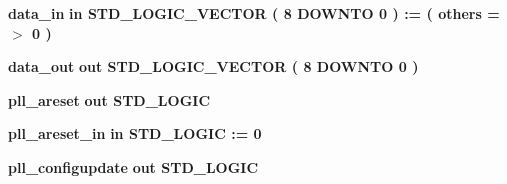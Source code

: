 \begin{DoxyCompactItemize}
\item 
{\bf data\+\_\+in}  {\bfseries {\bfseries \textcolor{keywordflow}{in}\textcolor{vhdlchar}{ }}} {\bfseries \textcolor{comment}{S\+T\+D\+\_\+\+L\+O\+G\+I\+C\+\_\+\+V\+E\+C\+T\+OR}\textcolor{vhdlchar}{ }\textcolor{vhdlchar}{(}\textcolor{vhdlchar}{ }\textcolor{vhdlchar}{ } \textcolor{vhdldigit}{8} \textcolor{vhdlchar}{ }\textcolor{keywordflow}{D\+O\+W\+N\+TO}\textcolor{vhdlchar}{ }\textcolor{vhdlchar}{ } \textcolor{vhdldigit}{0} \textcolor{vhdlchar}{ }\textcolor{vhdlchar}{)}\textcolor{vhdlchar}{ }\textcolor{vhdlchar}{ }\textcolor{vhdlchar}{ }\textcolor{vhdlchar}{\+:}\textcolor{vhdlchar}{=}\textcolor{vhdlchar}{ }\textcolor{vhdlchar}{(}\textcolor{vhdlchar}{ }\textcolor{vhdlchar}{ }\textcolor{keywordflow}{others}\textcolor{vhdlchar}{ }\textcolor{vhdlchar}{ }\textcolor{vhdlchar}{=}\textcolor{vhdlchar}{ }\textcolor{vhdlchar}{$>$}\textcolor{vhdlchar}{ }\textcolor{vhdlchar}{\textquotesingle{}}\textcolor{vhdlchar}{ } \textcolor{vhdldigit}{0} \textcolor{vhdlchar}{ }\textcolor{vhdlchar}{\textquotesingle{}}\textcolor{vhdlchar}{ }\textcolor{vhdlchar}{)}\textcolor{vhdlchar}{ }} 
\item 
{\bf data\+\_\+out}  {\bfseries {\bfseries \textcolor{keywordflow}{out}\textcolor{vhdlchar}{ }}} {\bfseries \textcolor{comment}{S\+T\+D\+\_\+\+L\+O\+G\+I\+C\+\_\+\+V\+E\+C\+T\+OR}\textcolor{vhdlchar}{ }\textcolor{vhdlchar}{(}\textcolor{vhdlchar}{ }\textcolor{vhdlchar}{ } \textcolor{vhdldigit}{8} \textcolor{vhdlchar}{ }\textcolor{keywordflow}{D\+O\+W\+N\+TO}\textcolor{vhdlchar}{ }\textcolor{vhdlchar}{ } \textcolor{vhdldigit}{0} \textcolor{vhdlchar}{ }\textcolor{vhdlchar}{)}\textcolor{vhdlchar}{ }} 
\item 
{\bf pll\+\_\+areset}  {\bfseries {\bfseries \textcolor{keywordflow}{out}\textcolor{vhdlchar}{ }}} {\bfseries \textcolor{comment}{S\+T\+D\+\_\+\+L\+O\+G\+IC}\textcolor{vhdlchar}{ }} 
\item 
{\bf pll\+\_\+areset\+\_\+in}  {\bfseries {\bfseries \textcolor{keywordflow}{in}\textcolor{vhdlchar}{ }}} {\bfseries \textcolor{comment}{S\+T\+D\+\_\+\+L\+O\+G\+IC}\textcolor{vhdlchar}{ }\textcolor{vhdlchar}{ }\textcolor{vhdlchar}{\+:}\textcolor{vhdlchar}{=}\textcolor{vhdlchar}{ }\textcolor{vhdlchar}{ }\textcolor{vhdlchar}{\textquotesingle{}}\textcolor{vhdlchar}{ } \textcolor{vhdldigit}{0} \textcolor{vhdlchar}{ }\textcolor{vhdlchar}{\textquotesingle{}}\textcolor{vhdlchar}{ }} 
\item 
{\bf pll\+\_\+configupdate}  {\bfseries {\bfseries \textcolor{keywordflow}{out}\textcolor{vhdlchar}{ }}} {\bfseries \textcolor{comment}{S\+T\+D\+\_\+\+L\+O\+G\+IC}\textcolor{vhdlchar}{ }} 

\end{DoxyCompactItemize}
